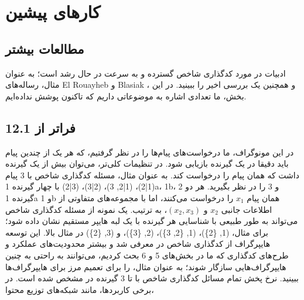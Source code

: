 \chapter{کارهای پیشین}
\section{مطالعات بیشتر}

ادبیات در مورد کدگذاری شاخص گسترده و به سرعت در حال رشد است؛ به عنوان مثال، رساله‌های El Rouayheb \lr{[63]} و Blasiak \lr{[30]}، و همچنین یک بررسی اخیر \lr{[33]} را ببینید. در این بخش، ما تعدادی اشاره به موضوعاتی داریم که تاکنون پوشش نداده‌ایم.

\section{12.1 فراتر از }
در این مونوگراف، ما درخواست‌های  پیام‌ها را در نظر گرفتیم، که هر یک از چندین پیام باید دقیقا در یک گیرنده بازیابی شود. در تنظیمات  کلی‌تر، می‌توان بیش از یک گیرنده داشت که همان پیام را درخواست کند. به عنوان مثال، مسئله کدگذاری شاخص  با 3 پیام (1|2)، (1|2, 3)، (2|3)، (3|2) با چهار گیرنده 1a، 1b، 2 و 3 را در نظر بگیرید. هر دو گیرنده 1a و 1b همان پیام \(x_1\) را درخواست می‌کنند، اما با مجموعه‌های متفاوتی از اطلاعات جانبی \(x_2\) و \((x_2, x_3)\)، به ترتیب.
یک نمونه از مسئله کدگذاری شاخص  می‌تواند به طور طبیعی با شناسایی هر گیرنده با یک لبه هایپر مستقیم نشان داده شود؛ برای مثال، (1, \{2\})، (1, \{2, 3\})، (2, \{3\})، و (3, \{2\}) در مثال بالا. این توسعه هایپرگراف از کدگذاری شاخص در \lr{[3]} معرفی شد و بیشتر محدودیت‌های عملکرد و طرح‌های کدگذاری که ما در بخش‌های 5 و 6 بحث کردیم، می‌توانند به راحتی به چنین هایپرگراف‌هایی سازگار شوند؛ به عنوان مثال، \lr{[28]} را برای تعمیم مرز  برای هایپرگراف‌ها ببینید. نرخ پخش تمام مسائل کدگذاری شاخص  با تا 3 گیرنده در \lr{[149]} مشخص شده است.
در برخی کاربردها، مانند شبکه‌های توزیع محتوا،

